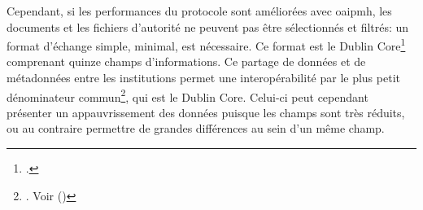 Cependant, si les performances du protocole sont améliorées avec \ac{oaipmh}, les documents et les fichiers d'autorité ne peuvent pas être sélectionnés et filtrés: un format d'échange simple, minimal, est nécessaire. Ce format est le Dublin Core\footcite{noauthor_dublin_nodate} comprenant quinze champs d'informations.
Ce partage de données et de métadonnées entre les institutions permet une \og interopérabilité par le plus petit dénominateur commun\fg{}\footnote{\cite{bermes_convergence_2013}. Voir  ()}, qui est le Dublin Core. Celui-ci peut cependant présenter un appauvrissement des données puisque les champs sont très réduits, ou au contraire permettre de grandes différences au sein d'un même champ.